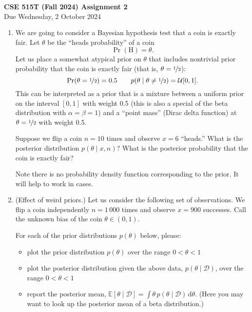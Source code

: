 \documentclass{article}
\newcommand{\given}{\mid}
\newcommand{\mc}[1]{\mathcal{#1}}
\newcommand{\data}{\mc{D}}
\newcommand{\intd}[1]{\,\mathrm{d}{#1}}
\begin{document}
{\large \textbf{CSE 515T (Fall 2024) Assignment 2}} \\
Due Wednesday, 2 October 2024 \\

\begin{enumerate}

\item

  We are going to consider a Bayesian hypothesis test that a coin is
  exactly fair. Let $\theta$ be the ``heads probability'' of a coin
  \[
    \Pr(\text{H}) = \theta.
  \]
  Let us place a somewhat atypical prior on $\theta$ that includes
  nontrivial prior probability that the coin is exactly fair (that is,
  $\theta = \nicefrac{1}{2}$):
  \[
    \Pr(\theta = \nicefrac{1}{2}) = 0.5
    \qquad
    p(\theta \given \theta \neq \nicefrac{1}{2}) = \mc{U}[0, 1].
  \]
  This can be interpreted as a prior that is a mixture between a uniform
  prior on the interval $[0, 1]$ with weight 0.5 (this is also a special
  of the beta distribution with $\alpha = \beta = 1$) and a ``point
  mass'' (Dirac delta function) at $\theta = \nicefrac{1}{2}$ with
  weight 0.5.

  Suppose we flip a coin $n = 10$ times and observe $x = 6$ ``heads.''
  What is the posterior distribution $p(\theta \given x, n)$?  What is
  the posterior probability that the coin is exactly fair?

  Note there is no probability density function corresponding to the
  prior. It will help to work in cases.

\item
  (Effect of weird priors.)  Let us consider the following set of
  observations. We flip a coin independently $n = 1\,000$ times and
  observe $x = 900$ successes. Call the unknown bias of the coin
  $\theta \in (0, 1)$.

  For each of the prior distributions $p(\theta)$ below, please:
  \begin{itemize}
  \item
    plot the prior distribution $p(\theta)$ over the range $0 < \theta < 1$
  \item
    plot the posterior distribution given the above data, $p(\theta
    \given \data)$, over the range $0 < \theta < 1$
  \item
    report the posterior mean,
    $\mathbb{E}[\theta \given \data] = \int \theta\,p(\theta\given\data)\intd\theta$.
    (Here you may want to look up the posterior mean of a beta distribution.)
  \end{itemize}


\end{enumerate}
\end{document}
